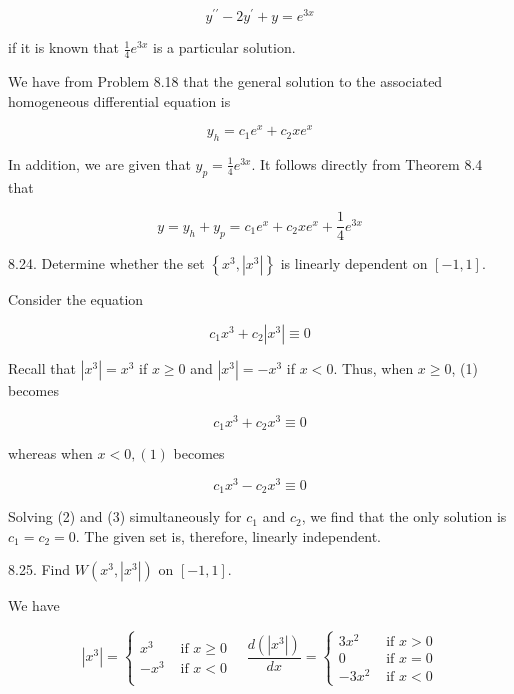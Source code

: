 \documentclass[10pt]{article}
\begin{document}
$$
y^{\prime \prime}-2 y^{\prime}+y=e^{3 x}
$$

if it is known that $\frac{1}{4} e^{3 x}$ is a particular solution.

We have from Problem 8.18 that the general solution to the associated homogeneous differential equation is

$$
y_{h}=c_{1} e^{x}+c_{2} x e^{x}
$$

In addition, we are given that $y_{p}=\frac{1}{4} e^{3 x}$. It follows directly from Theorem 8.4 that

$$
y=y_{h}+y_{p}=c_{1} e^{x}+c_{2} x e^{x}+\frac{1}{4} e^{3 x}
$$

8.24. Determine whether the set $\left\{x^{3},\left|x^{3}\right|\right\}$ is linearly dependent on $[-1,1]$.

Consider the equation


\begin{equation*}
c_{1} x^{3}+c_{2}\left|x^{3}\right| \equiv 0 \tag{1}
\end{equation*}


Recall that $\left|x^{3}\right|=x^{3}$ if $x \geq 0$ and $\left|x^{3}\right|=-x^{3}$ if $x<0$. Thus, when $x \geq 0$, (1) becomes


\begin{equation*}
c_{1} x^{3}+c_{2} x^{3} \equiv 0 \tag{2}
\end{equation*}


whereas when $x<0,(1)$ becomes


\begin{equation*}
c_{1} x^{3}-c_{2} x^{3} \equiv 0 \tag{3}
\end{equation*}


Solving (2) and (3) simultaneously for $c_{1}$ and $c_{2}$, we find that the only solution is $c_{1}=c_{2}=0$. The given set is, therefore, linearly independent.

8.25. Find $W\left(x^{3},\left|x^{3}\right|\right)$ on $[-1,1]$.

We have

$$
\left|x^{3}\right|=\left\{\begin{array}{cc}
x^{3} & \text { if } x \geq 0 \\
-x^{3} & \text { if } x<0
\end{array} \quad \frac{d\left(\left|x^{3}\right|\right)}{d x}=\left\{\begin{array}{cc}
3 x^{2} & \text { if } x>0 \\
0 & \text { if } x=0 \\
-3 x^{2} & \text { if } x<0
\end{array}\right.\right.
$$
\end{document}
